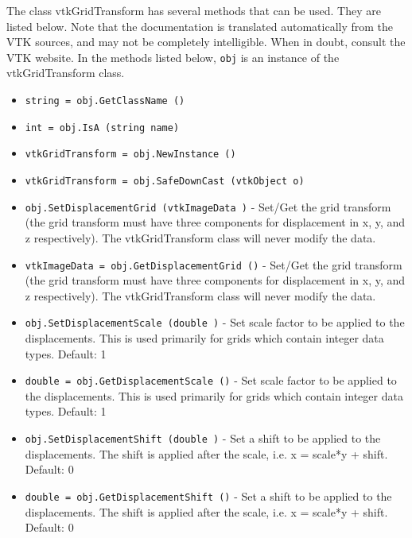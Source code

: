 The class vtkGridTransform has several methods that can be used.
  They are listed below.
Note that the documentation is translated automatically from the VTK sources,
and may not be completely intelligible.  When in doubt, consult the VTK website.
In the methods listed below, \verb|obj| is an instance of the vtkGridTransform class.
\begin{itemize}
\item  \verb|string = obj.GetClassName ()|

\item  \verb|int = obj.IsA (string name)|

\item  \verb|vtkGridTransform = obj.NewInstance ()|

\item  \verb|vtkGridTransform = obj.SafeDownCast (vtkObject o)|

\item  \verb|obj.SetDisplacementGrid (vtkImageData )| -  Set/Get the grid transform (the grid transform must have three 
 components for displacement in x, y, and z respectively).
 The vtkGridTransform class will never modify the data.

\item  \verb|vtkImageData = obj.GetDisplacementGrid ()| -  Set/Get the grid transform (the grid transform must have three 
 components for displacement in x, y, and z respectively).
 The vtkGridTransform class will never modify the data.

\item  \verb|obj.SetDisplacementScale (double )| -  Set scale factor to be applied to the displacements.
 This is used primarily for grids which contain integer
 data types.  Default: 1

\item  \verb|double = obj.GetDisplacementScale ()| -  Set scale factor to be applied to the displacements.
 This is used primarily for grids which contain integer
 data types.  Default: 1

\item  \verb|obj.SetDisplacementShift (double )| -  Set a shift to be applied to the displacements.  The shift
 is applied after the scale, i.e. x = scale*y + shift.
 Default: 0

\item  \verb|double = obj.GetDisplacementShift ()| -  Set a shift to be applied to the displacements.  The shift
 is applied after the scale, i.e. x = scale*y + shift.
 Default: 0


\end{itemize}

